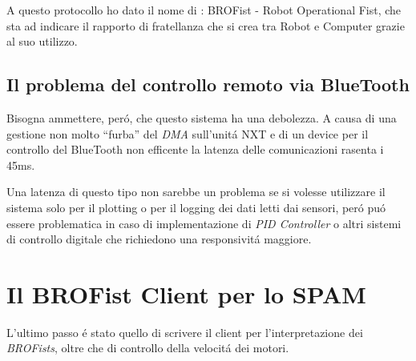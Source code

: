 A questo protocollo ho dato il nome di \BROFist{}: BROFist - Robot
Operational Fist, che sta ad indicare il rapporto di fratellanza che si
crea tra Robot e Computer grazie al suo utilizzo.

\subsection{Il problema del controllo remoto via BlueTooth}
Bisogna ammettere, per\'o, che questo sistema ha una debolezza. A causa di
una gestione non molto ``furba'' del \emph{DMA} sull'unit\'a NXT e di un
device per il controllo del BlueTooth non efficente la latenza delle
comunicazioni rasenta i 45ms.

Una latenza di questo tipo non sarebbe un problema se si volesse utilizzare
il sistema solo per il plotting o per il logging dei dati letti dai
sensori, per\'o pu\'o essere problematica in caso di implementazione di
\emph{PID Controller} o altri sistemi di controllo digitale che richiedono
una responsivit\'a maggiore.

\section{Il BROFist Client per lo SPAM}
L'ultimo passo \'e stato quello di scrivere il client per l'interpretazione
dei \emph{BROFists}, oltre che di controllo della velocit\'a dei motori.

